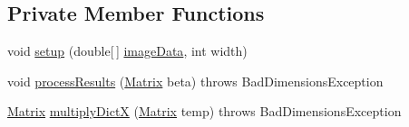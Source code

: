 \subsection*{Private Member Functions}
\begin{DoxyCompactItemize}
\item 
void \hyperlink{classOMP2D_1_1OMP2D_af3097b03ec47d8fb4322e6606c58d334}{setup} (double\mbox{[}$\,$\mbox{]} \hyperlink{classOMP2D_1_1OMP2D_aa03b270daab3c9ade9073fbb23032a22}{image\-Data}, int width)
\item 
void \hyperlink{classOMP2D_1_1OMP2D_a02281c6bdb3f7f6b6ceb9e1e64e82f71}{process\-Results} (\hyperlink{classOMP2D_1_1Matrix}{Matrix} beta)  throws Bad\-Dimensions\-Exception 
\item 
\hyperlink{classOMP2D_1_1Matrix}{Matrix} \hyperlink{classOMP2D_1_1OMP2D_a47591a44fc5194d0add04b63b60098a5}{multiply\-Dict\-X} (\hyperlink{classOMP2D_1_1Matrix}{Matrix} temp)  throws Bad\-Dimensions\-Exception 
\end{DoxyCompactItemize}
